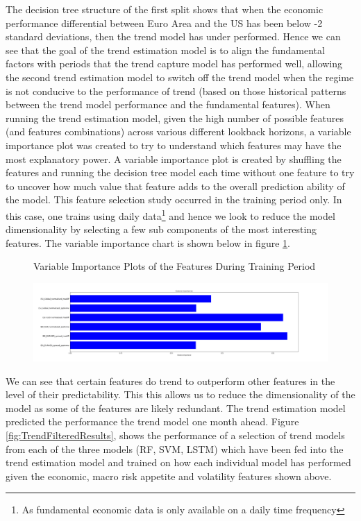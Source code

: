 \documentclass[11pt]{article}
\begin{document}
The decision tree structure of the first split shows that when the economic performance differential between Euro Area and the US has been below -2 standard deviations, then the trend model has under performed. Hence we can see that the goal of the trend estimation model is to align the fundamental factors with periods that the trend capture model has performed well, allowing the second trend estimation model to switch off the trend model when the regime is not conducive to the performance of trend (based on those historical patterns between the trend model performance and the fundamental features).
\clearpage
When running the trend estimation model, given the high number of possible features (and features combinations) across various different lookback horizons, a variable importance plot was created to try to understand which features may have the most explanatory power. A variable importance plot is created by shuffling the features and running the decision tree model each time without one feature to try to uncover how much value that feature adds to the overall prediction ability of the model. \newline  This feature selection study occurred in the training period only. In this case, one trains using daily data\footnote{As fundamental economic data is only available on a daily time frequency} and hence we look to reduce the model dimensionality by selecting a few sub components of the most interesting features. The variable importance chart is shown below in figure \ref{fig:varimp_RF_erf}.

\begin{figure}[h]
    \centering
	\caption{Variable Importance Plots of the Features During Training Period}    
	\includegraphics[width=1\textwidth]{varimp_LSTM1_erf}
    \label{fig:varimp_RF_erf}
     \caption*{}
\end{figure}
We can see that certain features do trend to outperform other features in the level of their predictability. This this allows us to reduce the dimensionality of the model as some of the features are likely redundant. The trend estimation model predicted the performance the trend model one month ahead.  Figure \ref{fig:TrendFilteredResults}, shows the performance of a selection of trend models from each of the three models (RF, SVM, LSTM) which have been fed into the trend estimation model and trained on how each individual model has performed given the economic, macro risk appetite and volatility features shown above.
\end{document}

